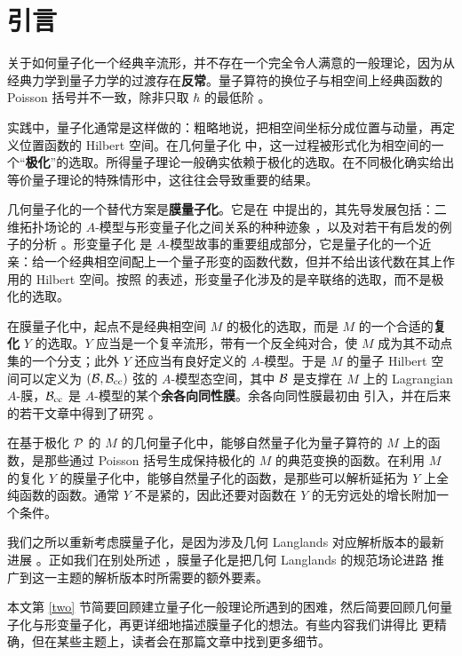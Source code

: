 \section{引言}\label{intro}

关于如何量子化一个经典辛流形，并不存在一个完全令人满意的一般理论，因为从经典力学到量子力学的过渡存在\textbf{反常}。量子算符的换位子与相空间上经典函数的 Poisson 括号并不一致，除非只取 $\hbar$ 的最低阶 \cite{G46,V51,Todorov}。

实践中，量子化通常是这样做的：粗略地说，把相空间坐标分成位置与动量，再定义位置函数的 Hilbert 空间。在几何量子化 \cite{Ko,So,Wo,Snia,Hall} 中，这一过程被形式化为相空间的一个“\textbf{极化}”的选取。所得量子理论一般确实依赖于极化的选取。在不同极化确实给出等价量子理论的特殊情形中，这往往会导致重要的结果。

几何量子化的一个替代方案是\textbf{膜量子化}。它是在 \cite{GW} 中提出的，其先导发展包括：二维拓扑场论的 $A$-模型与形变量子化之间关系的种种迹象 \cite{KO,BrS,Ka,Pe,Gu}，以及对若干有启发的例子的分析 \cite{AZ}。形变量子化 \cite{Many,WL,Fedosov,Kon,CF,CF2,SL} 是 $A$-模型故事的重要组成部分，它是量子化的一个近亲：给一个经典相空间配上一个量子形变的函数代数，但并不给出该代数在其上作用的 Hilbert 空间。按照 \cite{Fedosov} 的表述，形变量子化涉及的是辛联络的选取，而不是极化的选取。

在膜量子化中，起点不是经典相空间 $M$ 的极化的选取，而是 $M$ 的一个合适的\textbf{复化} $Y$ 的选取。$Y$ 应当是一个复辛流形，带有一个反全纯对合，使 $M$ 成为其不动点集的一个分支；此外 $Y$ 还应当有良好定义的 $A$-模型。于是 $M$ 的量子 Hilbert 空间可以定义为 $(\B,\B_\cc)$ 弦的 $A$-模型态空间，其中 $\B$ 是支撑在 $M$ 上的 Lagrangian $A$-膜，$\B_\cc$ 是 $A$-模型的某个\textbf{余各向同性膜}。余各向同性膜最初由 \cite{KO} 引入，并在后来的若干文章中得到了研究 \cite{Ka,Pe,Gu,AZ,KW,Herbst}。

在基于极化 $\P$ 的 $M$ 的几何量子化中，能够自然量子化为量子算符的 $M$ 上的函数，是那些通过 Poisson 括号生成保持极化的 $M$ 的典范变换的函数。在利用 $M$ 的复化 $Y$ 的膜量子化中，能够自然量子化的函数，是那些可以解析延拓为 $Y$ 上全纯函数的函数。通常 $Y$ 不是紧的，因此还要对函数在 $Y$ 的无穷远处的增长附加一个条件。

我们之所以重新考虑膜量子化，是因为涉及几何 Langlands 对应解析版本的最新进展 \cite{EFK,EFK2,EFK3,T}。正如我们在别处所述 \cite{GaW}，膜量子化是把几何 Langlands 的规范场论进路 \cite{KW} 推广到这一主题的解析版本时所需要的额外要素。

本文第 \ref{two} 节简要回顾建立量子化一般理论所遇到的困难，然后简要回顾几何量子化与形变量子化，再更详细地描述膜量子化的想法。有些内容我们讲得比 \cite{GW} 更精确，但在某些主题上，读者会在那篇文章中找到更多细节。

